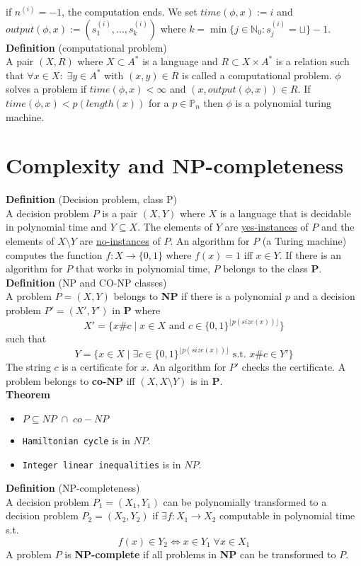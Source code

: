 \documentclass[a4paper, 12pt]{article}
\begin{document}
	if $n^{(i)} = -1$, the computation ends. We set $time(\phi, x) := i$ and $output(\phi, x) := (s_1^{(i)}, ..., s_k^{(i)})$ where $k = \min\{j \in \mathbb{N}_0 : s_j^{(i)} = \sqcup\} -1$.\\
	\textbf{Definition} (computational problem)\\
	A pair $(X, R)$ where $X\subset A^*$ is a language and $R\subset X \times A^*$ is a relation such that $\forall x \in X: \; \exists y \in A^*$ with $(x,y) \in R$ is called a computational problem. $\phi$ solves a problem if $time(\phi, x) < \infty$ and $(x, output(\phi, x)) \in R$. If $time(\phi, x) < p(length(x))$ for a $p \in \mathbb{P}_n$ then $\phi$ is a polynomial turing machine.\\
	\section{Complexity and NP-completeness}
	\textbf{Definition} (Decision problem, class P)\\
	A decision problem $P$ is a pair $(X,Y)$ where $X$ is a language that is decidable in polynomial time and $Y\subseteq X$. The elements of $Y$ are \underline{yes-instances} of $P$ and the elements of $X\setminus Y$ are \underline{no-instances} of $P$. An algorithm for $P$ (a Turing machine) computes the function $f: X\to \{0,1\}$ where $f(x) = 1$ iff $x \in Y$. If there is an algorithm for $P$ that works in polynomial time, $P$ belongs to the class \textbf{P}.\\
	\textbf{Definition} (NP and CO-NP classes)\\
	A problem $P = (X,Y)$ belongs to \textbf{NP} if there is a polynomial $p$ and a decision problem $P' = (X',Y')$ in \textbf{P} where \[X' = \{x\# c \;|\; x \in X \text{ and } c \in \{0,1\}^{\lfloor p(size(x))\rfloor}\}\]
	such that \[Y = \{x \in X \; |\; \exists c \in \{0,1\}^{\lfloor p(size(x))\rfloor} \text{ s.t. } x\#c \in Y'\}\]
	The string $c$ is a certificate for $x$. An algorithm for $P'$ checks the certificate. A problem belongs to \textbf{co-NP} iff $(X, X\setminus Y)$ is in \textbf{P}.\\
	\textbf{Theorem}
	\begin{itemize}
		\item $P \subseteq NP \;\cap\; co-NP$
		\item \texttt{Hamiltonian cycle} is in $NP$.
		\item \texttt{Integer linear inequalities} is in $NP$.
	\end{itemize}
	\textbf{Definition} (NP-completeness)\\
	A decision problem $P_1 = (X_1, Y_1)$ can be polynomially transformed to a decision problem $P_2 = (X_2,Y_2)$ if $\exists f: X_1 \to X_2$ computable in polynomial time s.t. \[f(x) \in Y_2 \Leftrightarrow x \in Y_1 \; \forall x \in X_1\]
	A problem $P$ is \textbf{NP-complete} if all problems in \textbf{NP} can be transformed to $P$.
\end{document}
